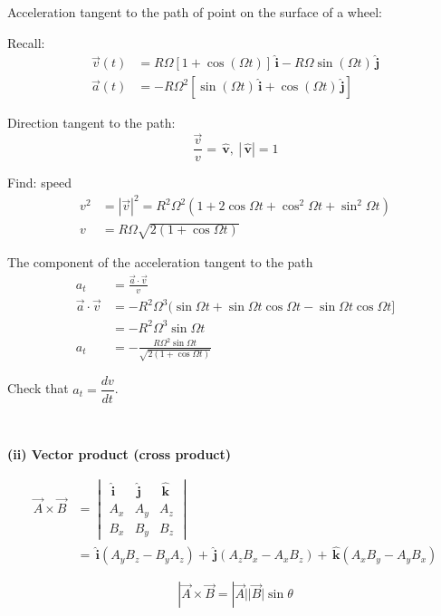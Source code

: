 \documentclass[twoside]{scrartcl}
\let\oldhat\hat
\renewcommand{\hat}[1]{\,\oldhat{\boldsymbol{\mathbf{#1}}}}
\begin{document}
\begin{example}
Acceleration tangent to the path of point on the surface of a wheel:

Recall:
\[
\begin{aligned}
\vec{v}(t) &= R\Omega[1 + \cos(\Omega t)]\hat{i} -R\Omega\sin(\Omega t)\hat{j}\\
\vec{a}(t) &= -R\Omega^2[\sin(\Omega t)\hat{i} + \cos(\Omega t)\hat{j}]
\end{aligned}
\]

Direction tangent to the path:
\[\frac{\vec{v}}{v} = \hat{v},~|\hat{v}| = 1\]

Find: speed
\[\begin{aligned}
v^2 &= |\vec{v}|^2 = R^2\Omega^2(1 + 2\cos\Omega t + \cos^2\Omega t + \sin^2\Omega t)\\
v &= R\Omega\sqrt{2(1 + \cos\Omega t)}
\end{aligned}\]

The component of the acceleration tangent to the path 
\[\begin{aligned}
a_t &= \frac{\vec{a}\cdot\vec{v}}{v}\\
\vec{a} \cdot \vec{v} &= -R^2\Omega^3(\sin\Omega t + \sin\Omega t \cos\Omega t - \sin\Omega t \cos \Omega t]\\
&= -R^2\Omega^3\sin\Omega t\\
a_t &= -\frac{R\Omega^2\sin\Omega t}{\sqrt{2(1 + \cos\Omega t)}}
\end{aligned}
\]


Check that $a_t = \dfrac{dv}{dt}$. 
\end{example}~

\textbf{(ii) Vector product (cross product)}

\[\begin{aligned}
\vec{A}\times \vec{B} &= \begin{vmatrix}
 \hat{i} & \hat{j} & \hat{k} \\
 A_x & A_y & A_z\\
 B_x & B_y & B_z	
 \end{vmatrix}\\
&= \hat{i}(A_yB_z - B_yA_z) + \hat{j}(A_zB_x - A_xB_z) + \hat{k}(A_xB_y - A_yB_x)
\end{aligned}
\]	

\begin{center}
  \end{center}
  \[|\vec{A} \times \vec{B} = |\vec{A}||\vec{B}|\sin\theta\]~
  
\end{document}
